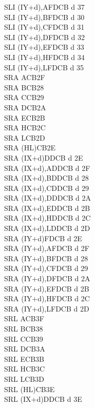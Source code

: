 \documentclass[12pt,twoside,openright,a4paper]{book}
\begin{document}
\begin{multicols}{3}
{\begin{tabbing}
		SLI (IY+d),A\UNDOC\>FDCB d 37\\
		SLI (IY+d),B\UNDOC\>FDCB d 30\\
		SLI (IY+d),C\UNDOC\>FDCB d 31\\
		SLI (IY+d),D\UNDOC\>FDCB d 32\\
		SLI (IY+d),E\UNDOC\>FDCB d 33\\
		SLI (IY+d),H\UNDOC\>FDCB d 34\\
		SLI (IY+d),L\UNDOC\>FDCB d 35\\
		SRA A\>CB2F\\
		SRA B\>CB28\\
		SRA C\>CB29\\
		SRA D\>CB2A\\
		SRA E\>CB2B\\
		SRA H\>CB2C\\
		SRA L\>CB2D\\
		SRA (HL)\>CB2E\\
		SRA (IX+d)\>DDCB d 2E\\
		SRA (IX+d),A\UNDOC\>DDCB d 2F\\
		SRA (IX+d),B\UNDOC\>DDCB d 28\\
		SRA (IX+d),C\UNDOC\>DDCB d 29\\
		SRA (IX+d),D\UNDOC\>DDCB d 2A\\
		SRA (IX+d),E\UNDOC\>DDCB d 2B\\
		SRA (IX+d),H\UNDOC\>DDCB d 2C\\
		SRA (IX+d),L\UNDOC\>DDCB d 2D\\
		SRA (IY+d)\>FDCB d 2E\\
		SRA (IY+d),A\UNDOC\>FDCB d 2F\\
		SRA (IY+d),B\UNDOC\>FDCB d 28\\
		SRA (IY+d),C\UNDOC\>FDCB d 29\\
		SRA (IY+d),D\UNDOC\>FDCB d 2A\\
		SRA (IY+d),E\UNDOC\>FDCB d 2B\\
		SRA (IY+d),H\UNDOC\>FDCB d 2C\\
		SRA (IY+d),L\UNDOC\>FDCB d 2D\\
		SRL A\>CB3F\\
		SRL B\>CB38\\
		SRL C\>CB39\\
		SRL D\>CB3A\\
		SRL E\>CB3B\\
		SRL H\>CB3C\\
		SRL L\>CB3D\\
		SRL (HL)\>CB3E\\
		SRL (IX+d)\>DDCB d 3E\\

\end{tabbing}}
\end{multicols}
\end{document}
